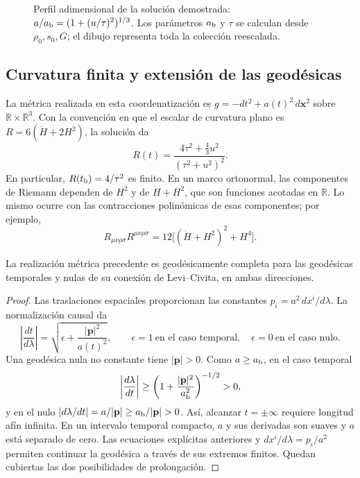 \begin{figure}[htbp]
\centering
{}
\caption{Perfil adimensional de la solución demostrada:
\(a/a_{\rm b}=(1+(u/\tau)^2)^{1/3}\).
Los parámetros \(a_{\rm b}\) y \(\tau\) se calculan desde
\(\rho_0,s_0,G\); el dibujo representa toda la colección reescalada.}
\label{vii:fig:rebote-polvo}
\end{figure}

\subsection{Curvatura finita y extensión de las geodésicas}
La métrica realizada en esta coordenatización es
\(g=-dt^2+a(t)^2\,d\mathbf x^2\) sobre
\(\mathbb R\times\mathbb R^3\). Con la convención en que
el escalar de curvatura plano es \(R=6(\dot H+2H^2)\), la solución da
\[
 R(t)=\frac{4\tau^2+\frac43u^2}{(\tau^2+u^2)^2}.
\]
En particular, \(R(t_{\rm b})=4/\tau^2\) es finito.
En un marco ortonormal, las componentes de Riemann dependen de
\(H^2\) y de \(\dot H+H^2\), que son funciones acotadas en
\(\mathbb R\). Lo mismo ocurre con las contracciones polinómicas
de esas componentes; por ejemplo,
\[
 R_{\mu\nu\rho\sigma}R^{\mu\nu\rho\sigma}
 =12\bigl[(\dot H+H^2)^2+H^4\bigr].
\]

\begin{proposition}
\label{vii:prop:completitud-causal-polvo}
La realización métrica precedente es geodésicamente completa
para las geodésicas temporales y nulas de su conexión de
Levi--Civita, en ambas direcciones.
\end{proposition}
\begin{proof}
Las traslaciones espaciales proporcionan las constantes
\(p_i=a^2\,dx^i/d\lambda\). La normalización causal da
\[
 \left|\frac{dt}{d\lambda}\right|
 =\sqrt{\epsilon+\frac{|\mathbf p|^2}{a(t)^2}},
 \qquad \epsilon=1\ \text{en el caso temporal},\quad
 \epsilon=0\ \text{en el caso nulo}.
\]
Una geodésica nula no constante tiene \(|\mathbf p|>0\).
Como \(a\geq a_{\rm b}\), en el caso temporal
\[
 \left|\frac{d\lambda}{dt}\right|
 \geq\left(1+\frac{|\mathbf p|^2}{a_{\rm b}^2}\right)^{-1/2}>0,
\]
y en el nulo
\(\left|d\lambda/dt\right|=a/|\mathbf p|
 \geq a_{\rm b}/|\mathbf p|>0\).
Así, alcanzar \(t=\pm\infty\) requiere longitud afín infinita.
En un intervalo temporal compacto, \(a\) y sus derivadas son
suaves y \(a\) está separado de cero. Las ecuaciones explícitas
anteriores y \(dx^i/d\lambda=p_i/a^2\) permiten continuar la
geodésica a través de sus extremos finitos. Quedan cubiertas
las dos posibilidades de prolongación.
\end{proof}

